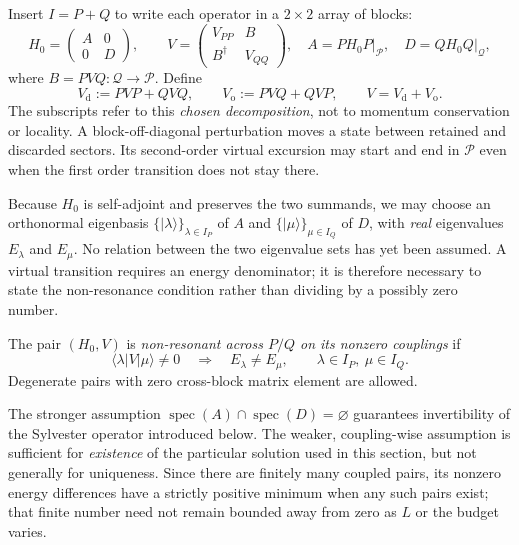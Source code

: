 Insert $I=P+Q$ to write each operator in a $2\times2$ array of blocks:
\begin{equation}
H_0=\begin{pmatrix}A&0\\0&D\end{pmatrix},\qquad
V=\begin{pmatrix}V_{PP}&B\\B^\dagger&V_{QQ}\end{pmatrix},
\quad A=PH_0P\big|_{\mathcal P},\quad D=QH_0Q\big|_{\mathcal Q},
\label{eq:ch21-block-matrices}
\end{equation}
where $B=PVQ\colon\mathcal Q\to\mathcal P$.  Define
\begin{equation}
 V_{\mathrm d}:=PVP+QVQ,\qquad
 V_{\mathrm o}:=PVQ+QVP,\qquad V=V_{\mathrm d}+V_{\mathrm o}.
\label{eq:ch21-diag-offdiag}
\end{equation}
The subscripts refer to this \emph{chosen decomposition}, not to
momentum conservation or locality.  A block-off-diagonal perturbation
moves a state between retained and discarded sectors.  Its second-order
virtual excursion may start and end in $\mathcal P$ even when the first
order transition does not stay there.

Because $H_0$ is self-adjoint and preserves the two summands, we may
choose an orthonormal eigenbasis
$\{\lvert\lambda\rangle\}_{\lambda\in I_P}$ of $A$ and
$\{\lvert\mu\rangle\}_{\mu\in I_Q}$ of $D$,
with \emph{real} eigenvalues $E_\lambda$ and $E_\mu$.  No relation between
the two eigenvalue sets has yet been assumed.  A virtual transition
requires an energy denominator; it is therefore necessary to state the
non-resonance condition rather than dividing by a possibly zero number.

\begin{definition}
\label{def:ch21-coupling-nonresonance}
The pair $(H_0,V)$ is \emph{non-resonant across $P/Q$ on its nonzero
couplings} if
\begin{equation}
 \langle\lambda\lvert V\rvert\mu\rangle\ne0
 \quad\Longrightarrow\quad E_\lambda\ne E_\mu,
 \qquad \lambda\in I_P,\ \mu\in I_Q.
\label{eq:ch21-nonresonance}
\end{equation}
Degenerate pairs with zero cross-block matrix element are allowed.
\end{definition}

The stronger assumption
$\operatorname{spec}(A)\cap\operatorname{spec}(D)=\varnothing$
guarantees invertibility of the Sylvester operator introduced below.
The weaker, coupling-wise assumption is sufficient for \emph{existence}
of the particular solution used in this section, but not generally for
uniqueness.  Since there are finitely many coupled pairs, its nonzero
energy differences have a strictly positive minimum when any such
pairs exist; that finite number need not remain bounded away from zero
as $L$ or the budget varies.

